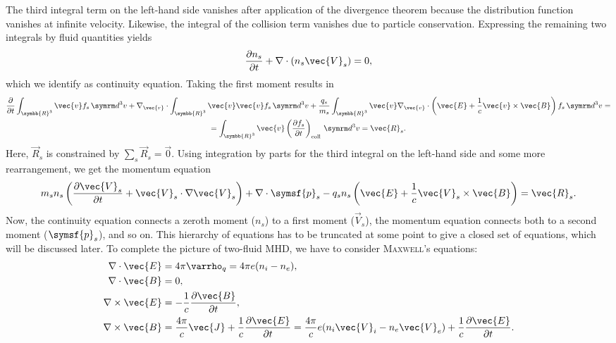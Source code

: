 The third integral term on the left-hand side vanishes after application of the divergence theorem because the distribution function vanishes at infinite velocity. Likewise, the integral of the collision term vanishes due to particle conservation. Expressing the remaining two integrals by fluid quantities yields
\begin{gather}
  \pd[n_{s}]{t} + \divg (n_{s} \vec{V}_{s}) = 0, \label{eq:continuity}
\end{gather}
which we identify as continuity equation. Taking the first moment results in
\begin{multline}
  \pd{t} \int_{\symbb{R}^{3}} \vec{v} f_{s} \, \diff^{3} v + \nabla_{\vec{r}} \cdot \int_{\symbb{R}^{3}} \vec{v} \vec{v} f_{s} \, \diff^{3} v + \frac{q_{s}}{m_{s}} \int_{\symbb{R}^{3}} \vec{v} \nabla_{\vec{v}} \cdot \left ( \vec{E} + \frac{1}{c} \vec{v} \times \vec{B} \right ) f_{s} \, \diff^{3} v = \\ = \int_{\symbb{R}^{3}} \vec{v} \left ( \pd[f_{s}]{t} \right )_{\text{coll}} \, \diff^{3} v = \vec{R}_{s}.
\end{multline}
Here, $\vec{R}_{s}$ is constrained by $\sum_{s} \vec{R}_{s} = \vec{0}$. Using integration by parts for the third integral on the left-hand side and some more rearrangement, we get the momentum equation
\begin{gather}
  m_{s} n_{s} \left ( \pd[\vec{V}_{s}]{t} + \vec{V}_{s} \cdot \grad \vec{V}_{s} \right ) + \divg \symsf{p}_{s} - q_{s} n_{s} \left ( \vec{E} + \frac{1}{c} \vec{V}_{s} \times \vec{B} \right ) = \vec{R}_{s}. \label{eq:momentum}
\end{gather}
Now, the continuity equation connects a zeroth moment ($n_{s}$) to a first moment ($\vec{V}_{s}$), the momentum equation connects both to a second moment ($\symsf{p}_{s}$), and so on. This hierarchy of equations has to be truncated at some point to give a closed set of equations, which will be discussed later. To complete the picture of two-fluid MHD, we have to consider \textsc{Maxwell}'s equations:
\begin{align}
  \divg \vec{E} &= 4 \pi \varrho_{q} = 4 \pi e (n_{i} - n_{e}), \label{eq:gauss_field} \\
  \divg \vec{B} &= 0, \label{eq:no_monopoles_field} \\
  \curl \vec{E} &= -\frac{1}{c} \pd[\vec{B}]{t}, \label{eq:faraday_field} \\
  \curl \vec{B} &= \frac{4 \pi}{c} \vec{J} + \frac{1}{c} \pd[\vec{E}]{t} = \frac{4 \pi}{c} e (n_{i} \vec{V}_{i} - n_{e} \vec{V}_{e}) + \frac{1}{c} \pd[\vec{E}]{t}. \label{eq:ampere_field}
\end{align}
